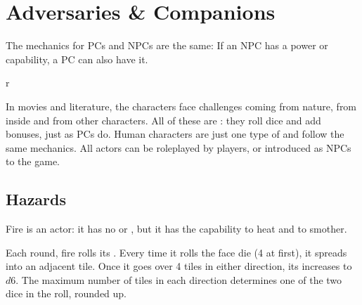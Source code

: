 \documentclass{LegrandOrangeTufteBook}
\begin{document}
\chapterspaceabove{6.75cm}
\chapterspacebelow{11.25cm}


\chapter*{Adversaries \& Companions}

\begin{emphasisParagraph}
	The mechanics for PCs and NPCs are the same: If an NPC has a power or capability,
	a PC can also have it.
\end{emphasisParagraph}


\begin{wrapfigure}{r}{}
\end{wrapfigure}


In movies and literature, the characters face challenges coming from nature, from inside and from other characters.
All of these are : they roll dice and add bonuses, just as PCs do.
Human characters are just one type of  and follow the same mechanics.
All actors can be roleplayed by players, or introduced as NPCs to the game.


\section*{Hazards}

Fire is an actor: it has no  or ,
but it has the capability to heat and to smother.




Each round, fire rolls its . Every time it rolls the face die (4 at first),
it spreads into an adjacent tile.
Once it goes over 4 tiles in either direction, its  increases to $d6$.
The maximum number of tiles in each direction determines one of the two dice in the  roll, rounded up.
\\
\end{document}
